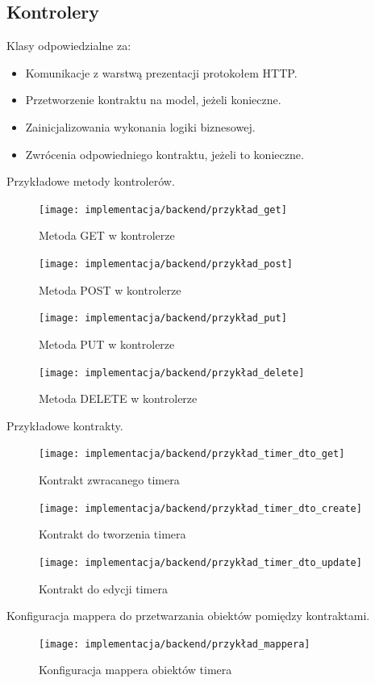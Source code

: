 \documentclass[a4paper,11pt]{report}
\begin{document}
\subsection{Kontrolery}
Klasy odpowiedzialne za:
\begin{itemize}
	\item Komunikacje z warstwą prezentacji protokołem HTTP.
	\item Przetworzenie kontraktu na model, jeżeli konieczne.
	\item Zainicjalizowania wykonania logiki biznesowej.
	\item Zwrócenia odpowiedniego kontraktu, jeżeli to konieczne.
\end{itemize}
Przykładowe metody kontrolerów.
\begin{figure}[H]
	\centering
	\texttt{[image: implementacja/backend/przykład\_get]}\\
	\caption{Metoda GET w kontrolerze}
	\label{fig:przykład_get}
\end{figure}
\begin{figure}[H]
	\centering
	\texttt{[image: implementacja/backend/przykład\_post]}\\
	\caption{Metoda POST w kontrolerze}
	\label{fig:przykład_post}
\end{figure}
\begin{figure}[H]
	\centering
	\texttt{[image: implementacja/backend/przykład\_put]}\\
	\caption{Metoda PUT w kontrolerze}
	\label{fig:przykład_put}
\end{figure}
\begin{figure}[H]
	\centering
	\texttt{[image: implementacja/backend/przykład\_delete]}\\
	\caption{Metoda DELETE w kontrolerze}
	\label{fig:przykład_delete}
\end{figure}
Przykładowe kontrakty.
\begin{figure}[H]
	\centering
	\texttt{[image: implementacja/backend/przykład\_timer\_dto\_get]}\\
	\caption{Kontrakt zwracanego timera}
	\label{fig:przykład_timer_dto_get}
\end{figure}
\begin{figure}[H]
	\centering
	\texttt{[image: implementacja/backend/przykład\_timer\_dto\_create]}\\
	\caption{Kontrakt do tworzenia timera}
	\label{fig:przykład_timer_dto_create}
\end{figure}
\begin{figure}[H]
	\centering
	\texttt{[image: implementacja/backend/przykład\_timer\_dto\_update]}\\
	\caption{Kontrakt do edycji timera}
	\label{fig:przykład_timer_dto_update}
\end{figure}
Konfiguracja mappera do przetwarzania obiektów pomiędzy kontraktami.
\begin{figure}[H]
	\centering
	\texttt{[image: implementacja/backend/przykład\_mappera]}\\
	\caption{Konfiguracja mappera obiektów timera}
	\label{fig:przykład_mappera}
\end{figure}
\end{document}
